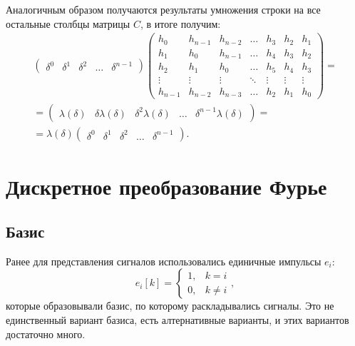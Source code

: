 Аналогичным образом получаются результаты умножения строки на все остальные столбцы матрицы $C$, в итоге получим:
\begin{multline*}
    \begin{pmatrix}
        \delta^0 & \delta^1 & \delta^2 & \dots & \delta^{n-1}
    \end{pmatrix}
    \begin{pmatrix}
        h_0     & h_{n-1} & h_{n-2} & \dots  & h_3    & h_2    & h_1    \\
        h_1     & h_0     & h_{n-1} & \dots  & h_4    & h_3    & h_2    \\
        h_2     & h_1     & h_0     & \dots  & h_5    & h_4    & h_3    \\
        \vdots  & \vdots  & \vdots  & \ddots & \vdots & \vdots & \vdots \\
        h_{n-1} & h_{n-2} & h_{n-3} & \dots  & h_2    & h_1    & h_0
    \end{pmatrix} = \\
    = \begin{pmatrix}
          \lambda(\delta) & \delta \lambda(\delta) & \delta^2 \lambda(\delta) & \dots & \delta^{n-1} \lambda(\delta)
    \end{pmatrix} = \\
    = \lambda(\delta)
    \begin{pmatrix}
        \delta^0 & \delta^1 & \delta^2 & \dots & \delta^{n-1}
    \end{pmatrix}
    .
\end{multline*}


\section{Дискретное преобразование Фурье}

\subsection{Базис}

Ранее для представления сигналов использовались единичные импульсы $e_i$:
\[
    e_i[k]
    =
    \left\{
    \begin{array}{ll}
        1, & k = i    \\
        0, & k \neq i
    \end{array}
    \right.
    ,
\]
которые образовывали базис, по которому раскладывались сигналы. Это не единственный вариант базиса, есть алтернативные варианты, и этих вариантов достаточно много.

